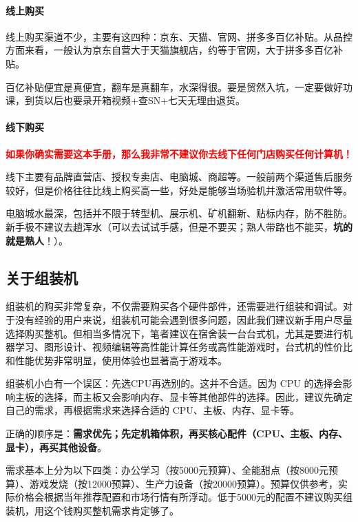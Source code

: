 \paragraph{线上购买}

线上购买渠道不少，主要有这四种：京东、天猫、官网、拼多多百亿补贴。从品控方面来看，一般认为京东自营大于天猫旗舰店，约等于官网，大于拼多多百亿补贴。

百亿补贴便宜是真便宜，翻车是真翻车，水深得很。要是贸然入坑，一定要做好功课，到货以后也要录开箱视频+查SN+七天无理由退货。

\paragraph{线下购买}

\textcolor{red}{\bfseries 如果你确实需要这本手册，那么我非常不建议你去线下任何门店购买任何计算机！}

线下主要有品牌直营店、授权专卖店、电脑城、商超等。一般前两个渠道售后服务较好，但是价格往往比线上购买高一些，好处是能够当场验机并激活常用软件等。

电脑城水最深，包括并不限于转型机、展示机、矿机翻新、贴标内存，防不胜防。新手极不建议去趟浑水（可以去试试手感，但是不要买；熟人带路也不能买，\textbf{坑的就是熟人}！）。

\subsection{关于组装机}

组装机的购买非常复杂，不仅需要购买各个硬件部件，还需要进行组装和调试。对于没有经验的用户来说，组装机可能会遇到很多问题，因此我们建议新手用户尽量选择购买整机。但相当多情况下，笔者建议在宿舍装一台台式机，尤其是要进行机器学习、图形设计、视频编辑等高性能计算任务或高性能游戏时，台式机的性价比和性能优势非常明显，使用体验也显著高于游戏本。

组装机小白有一个误区：先选CPU再选别的。这并不合适。因为 CPU 的选择会影响主板的选择，而主板又会影响内存、显卡等其他部件的选择。因此，建议先确定自己的需求，再根据需求来选择合适的 CPU、主板、内存、显卡等。

正确的顺序是：\textbf{需求优先；先定机箱体积，再买核心配件（CPU、主板、内存、显卡），再买其他设备}。

需求基本上分为以下四类：办公学习（按5000元预算）、全能甜点（按8000元预算）、游戏发烧（按12000预算）、生产力设备（按20000预算）。预算仅供参考，实际价格会根据当年推荐配置和市场行情有所浮动。低于5000元的配置不建议购买组装机，用这个钱购买整机需求肯定够了。

